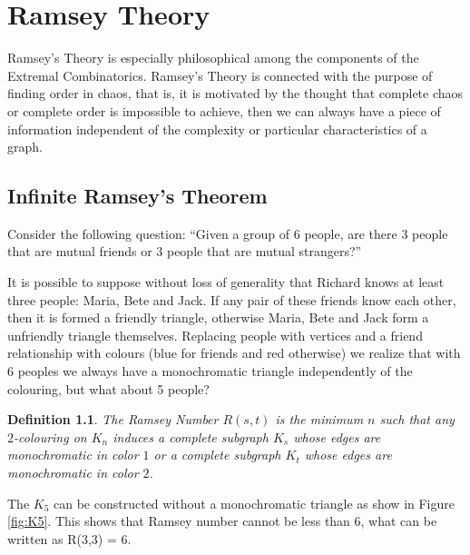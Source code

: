 \documentclass[12pt,twoside,a4paper,bibliography=totocnumbered]{book}
\numberwithin{equation}{section}
\newtheorem{definition}	[theorem] {Definition}
\theoremstyle{remark}
\begin{document}



\chapter{Ramsey Theory}

Ramsey's Theory is especially philosophical among the components of the Extremal Combinatorics. Ramsey's Theory is connected with the purpose of finding order in chaos, that is, it is motivated by the thought that complete chaos or complete order is impossible to achieve, then we can always have a piece of information independent of the complexity or particular characteristics of a graph.

\section{Infinite Ramsey's Theorem}
Consider the following question:
``Given a group of 6 people, are there 3 people that are mutual friends or 3 people that are mutual strangers?''

It is possible to suppose without loss of generality that Richard knows at least three people: Maria, Bete and Jack. If any pair of these friends know each other, then it is formed a friendly triangle, otherwise Maria, Bete and Jack form a unfriendly triangle themselves. Replacing people with vertices and a friend relationship with colours (blue for friends and red otherwise) we realize that with 6 peoples we always have a monochromatic triangle independently of the colouring, but what about 5 people?

\begin{definition}\label{def:RamseyNumbers} 
The Ramsey Number $R(s,t)$ is the minimum $n$ such that any $2$-colouring on $K_n$ induces a complete subgraph $K_s$ whose edges are monochromatic in color $1$ or a complete subgraph $K_t$ whose edges are monochromatic in color $2$.
\end{definition}

The $K_5$ can be constructed without a monochromatic triangle as show in Figure \ref{fig:K5}. This shows that Ramsey number cannot be less than 6, what can be written as  R(3,3) = 6.
\end{document}
